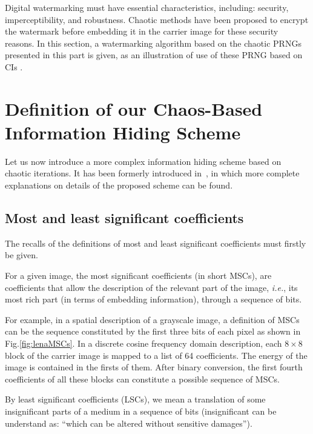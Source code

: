 Digital watermarking must have essential characteristics, including: security, imperceptibility, and robustness.
Chaotic methods have been proposed to encrypt the watermark before embedding it in the carrier image for these security reasons. %
In this section, a watermarking algorithm based on the chaotic PRNGs presented in this part is given, as an 
illustration of use of these PRNG based on CIs \cite{submit2, bibtexwangqianxue}.

\section{Definition of our Chaos-Based Information Hiding Scheme}
\label{sec:Algo}

Let us now introduce a more complex information hiding scheme based on chaotic iterations.
It has been formerly introduced in~\cite{gfb10:ip,bg10:ip}, in which more complete 
explanations on details of the
proposed scheme can be found.


\subsection{Most and least significant coefficients}

The recalls of the definitions of most and least significant coefficients must firstly be given.

\begin{definition}
For a given image, the most significant coefficients (in short MSCs), are
coefficients that allow the description of the relevant part of the image,
\emph{i.e.}, its most rich part (in terms of embedding information), through a sequence of bits.
\end{definition}

For example, in a spatial description of a grayscale image, a definition of MSCs 
can be the sequence constituted by the first three bits of each pixel as shown in 
Fig.\ref{fig:lenaMSCs}. In a discrete cosine frequency domain description, 
each $8\times 8$ block of the carrier image is mapped to a list of 64 coefficients. 
The energy of the image is contained in the firsts of them. After binary conversion, 
the first fourth coefficients of all these blocks can constitute a possible sequence of MSCs.

\begin{definition}
By least significant coefficients (LSCs), we mean a translation of some
insignificant parts of a medium in a sequence of bits (insignificant can be understand as: 
``which can be altered without sensitive damages'').
\end{definition}

